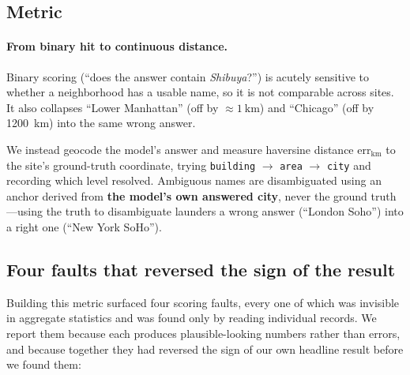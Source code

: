 \documentclass[10pt,a4paper]{article}
\newcommand{\errkm}{\ensuremath{\mathrm{err}_{\mathrm{km}}}}
\begin{document}

\subsection{Metric}
\label{sec:scoring}

\paragraph{From binary hit to continuous distance.}

Binary scoring (``does the answer contain \emph{Shibuya}?'') is acutely
sensitive to whether a neighborhood has a usable name, so it is not comparable
across sites. It also collapses ``Lower Manhattan'' (off by
$\approx\SI{1}{\kilo\metre}$) and ``Chicago'' (off by \SI{1200}{\kilo\metre})
into the same wrong answer.

We instead geocode the model's answer and measure haversine distance \errkm{} to
the site's ground-truth coordinate, trying \texttt{building} $\to$ \texttt{area} $\to$
\texttt{city} and recording which level resolved. Ambiguous names are
disambiguated using an anchor derived from \textbf{the model's own answered
city}, never the ground truth---using the truth to disambiguate launders a wrong
answer (``London Soho'') into a right one (``New York SoHo'').

\subsection{Four faults that reversed the sign of the result}
\label{sec:faults}

Building this metric surfaced four scoring faults, every one of which was
invisible in aggregate statistics and was found only by reading individual
records. We report them because each produces plausible-looking numbers rather
than errors, and because together they had reversed the sign of our own headline
result before we found them:
\end{document}
